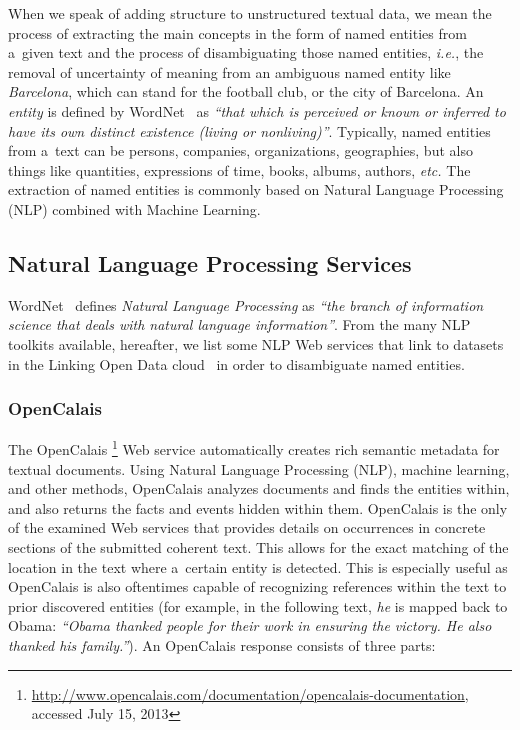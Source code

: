 When we speak of adding structure to unstructured textual data,
we mean the process of extracting the main concepts
in the form of named entities from a~given text
and the process of disambiguating those named entities,
\emph{i.e.}, the removal of uncertainty of meaning from
an ambiguous named entity like \emph{Barcelona},
which can stand for the football club, or the city of Barcelona.
An \emph{entity} is defined by
WordNet~\cite{miller1995wordnet,fellbaum1998wordnet}
as \textit{``that which is perceived or known or inferred
to have its own distinct existence (living or nonliving)''}. 
Typically, named entities from a~text can be persons, companies,
organizations, geographies, but also things like quantities,
expressions of time, books, albums, authors, \emph{etc.}
The extraction of named entities is commonly based on
Natural Language Processing (NLP) combined with Machine Learning.

\subsection{Natural Language Processing Services}
\label{sec:nlp-services}

WordNet~\cite{miller1995wordnet,fellbaum1998wordnet}
defines \emph{Natural Language Processing} as
\textit{``the branch of information science that deals with
natural language information''}.
From the many NLP toolkits available,
hereafter, we list some NLP Web services
that link to datasets in the
Linking Open Data
cloud~\cite{bizer2011statelodcloud,cyganiak2011lodcloud}
in order to disambiguate named entities.

\subsubsection{OpenCalais}\label{sec:opencalais}

The OpenCalais%
\footnote{\url{http://www.opencalais.com/documentation/opencalais-documentation},
accessed July 15, 2013}
Web service automatically creates rich semantic metadata
for textual documents.
Using Natural Language Processing (NLP),
machine learning, and other methods, OpenCalais analyzes documents
and finds the entities within, and also returns the facts and
events hidden within them.
OpenCalais is the only of the examined Web services
that provides details on occurrences in concrete sections
of the submitted coherent text.
This allows for the exact matching of the location in the text
where a~certain entity is detected.
This is especially useful as OpenCalais
is also oftentimes capable of recognizing references
within the text to prior discovered entities
(for example, in the following text,
\emph{he} is mapped back to Obama: \textit{``\emph{Obama}
thanked people for their work in ensuring the victory.
\emph{He} also thanked his family.''}).
An OpenCalais response consists of three parts:

